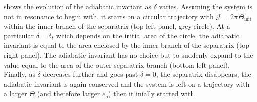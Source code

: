 \documentclass[ twoside,openright,titlepage,numbers=noenddot,headinclude,%
                footinclude=true,cleardoublepage=empty,abstractoff, %
                BCOR=5mm,paper=a4,fontsize=11pt,%
                american,%
                ]{scrreprt}
\begin{document}
 shows the evolution of the adiabatic 
invariant as $\delta$ varies. Assuming the system is not in resonance
to begin with, it starts on a circular trajectory with $\mathcal{J}
=2\pi\,\Theta_\text{init}$ within the inner branch of the separatrix
(top left panel, grey circle). At a particular $\delta=\delta_t$
which depends on the initial area of the circle, the adiabatic 
invariant is equal to the area enclosed by the inner branch of the
separatrix (top right panel). The adiabatic invariant has no choice
but to suddenly expand to the value equal to the area of the
outer separatrix branch (bottom left panel). Finally, as $\delta$
decreases further and goes past $\delta=0$, the separatrix
disappears, the adiabatic invariant is again conserved and the 
system is left on a trajectory with a larger $\Theta$ (and
therefore larger $e_o$) then it inially started with.
\end{document}
